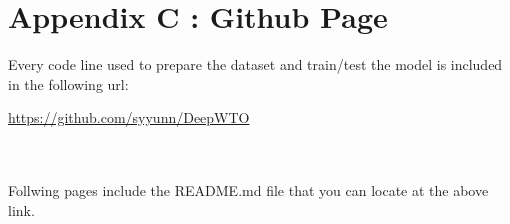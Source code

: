 \documentclass[sigconf]{acmart}
\begin{document}
\begin{appendices}
\begin{lstlisting}[language=Python, frame=tlrb]
\end{lstlisting}
\section*{Appendix C : Github Page}
Every code line used to prepare the dataset and train/test the model is included in the following url:
\begin{displayquote}
\hyperlink{https://github.com/syyunn/DeepWTO}{https://github.com/syyunn/DeepWTO}
\end{displayquote}\\\\
Follwing pages include the README.md file that you can locate at the above link.
\end{appendices}
\end{document}
